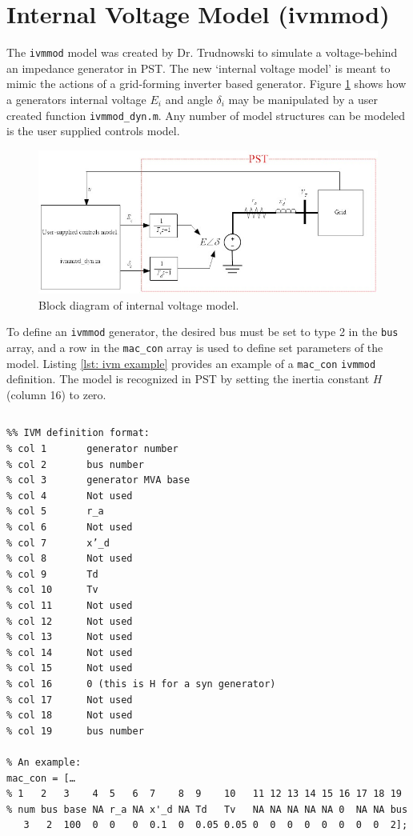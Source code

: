 \section{Internal Voltage Model (ivmmod)}  
The \verb|ivmmod| model was created by Dr. Trudnowski to simulate a voltage-behind an impedance generator in PST.
The new `internal voltage model' is meant to mimic the actions of a grid-forming inverter based generator.
Figure \ref{fig: ivmmod BD} shows how a generators internal voltage $E_i$ and angle $\delta_i$ may be manipulated by a user created function \verb|ivmmod_dyn.m|.
Any number of model structures can be modeled is the user supplied controls model.

\begin{figure}[H]
	\centering
	\footnotesize
	\includegraphics[width=\linewidth]{sections/ivmmod/IVM_Model}
	\caption{Block diagram of internal voltage model.}
	\label{fig: ivmmod BD}
\end{figure}%

To define an \verb|ivmmod| generator, the desired bus must be set to type 2 in the \verb|bus| array, and a row in the  \verb|mac_con| array is used to define set parameters of the model.
Listing \ref{lst: ivm example} provides an example of a \verb|mac_con| \verb|ivmmod| definition.
The model is recognized in PST by setting the inertia constant $H$ (column  16) to zero.

\pagebreak
\begin{lstlisting}[caption={IVMMOD Definition Example},label={lst: ivm example}]
\end{lstlisting}\vspace{-2 em}
\begin{verbatim}
%% IVM definition format:
% col 1       generator number
% col 2       bus number
% col 3       generator MVA base
% col 4       Not used
% col 5       r_a
% col 6       Not used
% col 7       x’_d
% col 8       Not used
% col 9       Td
% col 10      Tv
% col 11      Not used
% col 12      Not used
% col 13      Not used
% col 14      Not used
% col 15      Not used
% col 16      0 (this is H for a syn generator)
% col 17      Not used
% col 18      Not used
% col 19      bus number

% An example:
mac_con = […
% 1   2   3    4  5   6  7    8  9    10   11 12 13 14 15 16 17 18 19
% num bus base NA r_a NA x'_d NA Td   Tv   NA NA NA NA NA 0  NA NA bus
   3   2  100  0  0   0  0.1  0  0.05 0.05 0  0  0  0  0  0  0  0  2];
\end{verbatim}

